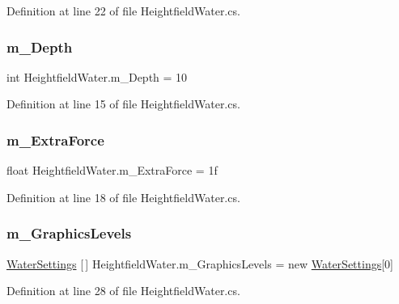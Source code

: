 Definition at line 22 of file Heightfield\+Water.\+cs.

\mbox{\label{class_heightfield_water_a152fe31f279786d7067a577f648e4ba0}} 
\subsubsection{\texorpdfstring{m\+\_\+\+Depth}{m\_Depth}}
{\footnotesize\ttfamily int Heightfield\+Water.\+m\+\_\+\+Depth = 10}



Definition at line 15 of file Heightfield\+Water.\+cs.

\mbox{\label{class_heightfield_water_af73d13f1e8121c6afe84cb745875b00d}} 
\subsubsection{\texorpdfstring{m\+\_\+\+Extra\+Force}{m\_ExtraForce}}
{\footnotesize\ttfamily float Heightfield\+Water.\+m\+\_\+\+Extra\+Force = 1f}



Definition at line 18 of file Heightfield\+Water.\+cs.

\mbox{\label{class_heightfield_water_a7ed58ebee1bd5917266ab21cc50457dc}} 
\subsubsection{\texorpdfstring{m\+\_\+\+Graphics\+Levels}{m\_GraphicsLevels}}
{\footnotesize\ttfamily \mbox{\hyperlink{class_water_settings}{Water\+Settings}} \mbox{[}$\,$\mbox{]} Heightfield\+Water.\+m\+\_\+\+Graphics\+Levels = new \mbox{\hyperlink{class_water_settings}{Water\+Settings}}\mbox{[}0\mbox{]}}



Definition at line 28 of file Heightfield\+Water.\+cs.


